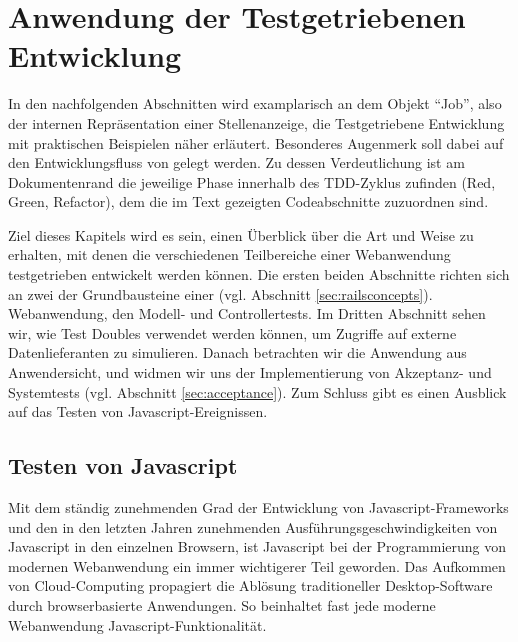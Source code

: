 \chapter{Anwendung der Testgetriebenen Entwicklung}
\label{sec:awtdd}

In den nachfolgenden Abschnitten wird examplarisch an dem Objekt "`Job"', also der internen Repräsentation einer Stellenanzeige, die Testgetriebene Entwicklung mit praktischen Beispielen näher erläutert.
Besonderes Augenmerk soll dabei auf den Entwicklungsfluss von  gelegt werden. Zu dessen Verdeutlichung ist am Dokumentenrand die jeweilige Phase innerhalb des TDD-Zyklus zufinden (Red, Green, Refactor), dem die im Text gezeigten Codeabschnitte zuzuordnen sind.

Ziel dieses Kapitels wird es sein, einen Überblick über die Art und Weise zu erhalten, mit denen die verschiedenen Teilbereiche einer Webanwendung testgetrieben entwickelt werden können.
Die ersten beiden Abschnitte richten sich an zwei der Grundbausteine einer  (vgl. Abschnitt \ref{sec:railsconcepts}).
Webanwendung, den Modell- und Controllertests. Im Dritten Abschnitt sehen wir, wie Test Doubles verwendet werden können, um Zugriffe auf externe Datenlieferanten zu simulieren. Danach betrachten wir die Anwendung aus Anwendersicht, und widmen wir uns der Implementierung von Akzeptanz- und Systemtests (vgl. Abschnitt \ref{sec:acceptance}). 
Zum Schluss gibt es einen Ausblick auf das Testen von Javascript-Ereignissen.






\section{Testen von Javascript}

Mit dem ständig zunehmenden Grad der Entwicklung von Javascript-Frameworks und den in den letzten Jahren zunehmenden Ausführungsgeschwindigkeiten von Javascript in den einzelnen Browsern, ist Javascript bei der Programmierung von modernen Webanwendung ein immer wichtigerer Teil geworden. Das Aufkommen von Cloud-Computing propagiert die Ablösung traditioneller Desktop-Software durch browserbasierte Anwendungen. So beinhaltet fast jede moderne Webanwendung Javascript-Funktionalität.

